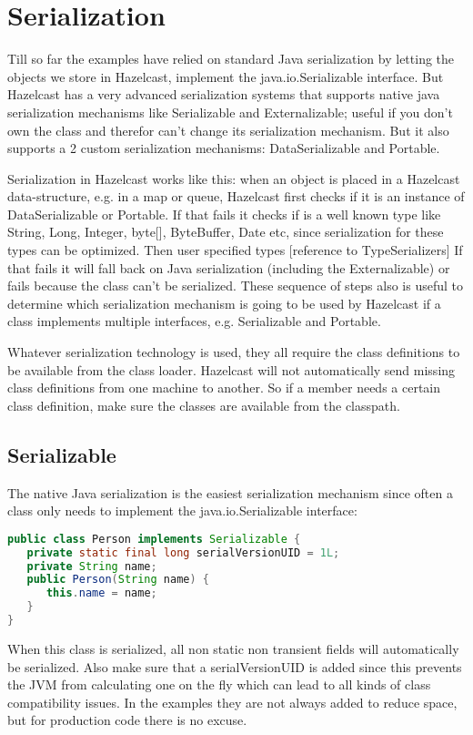 \chapter{Serialization}
Till so far the examples have relied on standard Java serialization by letting the objects we store in Hazelcast, implement the java.io.Serializable interface. But Hazelcast has a very advanced serialization systems that supports native java serialization mechanisms like Serializable and Externalizable;  useful if you don't own the class and therefor can't change its serialization mechanism. But it also supports a 2 custom serialization mechanisms: DataSerializable and Portable.

Serialization in Hazelcast works like this: when an object is placed in a Hazelcast data-structure, e.g. in a map or queue, Hazelcast first checks if it is an instance of DataSerializable or Portable. If that fails it checks if is a well known type like String, Long, Integer, byte[], ByteBuffer, Date etc, since serialization for these types can be optimized. Then user specified types [reference to TypeSerializers] If that fails it will fall back on Java serialization (including the Externalizable) or fails because the class can't be serialized. These sequence of steps also is useful to determine which serialization mechanism is going to be used by Hazelcast if a class implements multiple interfaces, e.g. Serializable and Portable.

Whatever serialization technology is used, they all require the class definitions to be available from the class loader. Hazelcast will not automatically send missing class definitions from one machine to another. So if a member needs a certain class definition, make sure the classes are available from the classpath. 

\section{Serializable}
The native Java serialization is the easiest serialization mechanism since often a class only needs to implement the java.io.Serializable interface:
\begin{lstlisting}[language=java]
public class Person implements Serializable {
   private static final long serialVersionUID = 1L;
   private String name;
   public Person(String name) {
      this.name = name; 
   }
}
\end{lstlisting}
When this class is serialized, all non static non transient fields will automatically be serialized. Also make sure that a serialVersionUID is added since this prevents the JVM from calculating one on the fly which can lead to all kinds of class compatibility issues. In the examples they are not always added to reduce space, but for production code there is no excuse.

